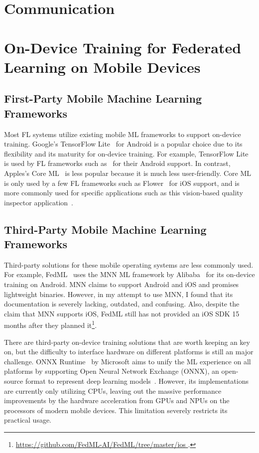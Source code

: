 \documentclass[conference]{IEEEtran}
\begin{document}
\section{Communication}

\section{On-Device Training for Federated Learning on Mobile Devices}

\subsection{First-Party Mobile Machine Learning Frameworks}

Most FL systems utilize existing mobile ML frameworks to
support on-device training.
Google's TensorFlow Lite~\cite{tensorflow2015-whitepaper,abadi2016tensorflow}
for Android is
a popular choice due to its flexibility and
its maturity for on-device training.
For example, TensorFlow Lite is used by FL frameworks such as~\cite{
    beutel2020flower,mathur2021ondevice,kourtellis2020flaas,katevas2022flaas}
for their Android support.
In contrast, Apples's Core ML~\cite{coreml} is less popular because
it is much less user-friendly.
Core ML is only used by a few FL frameworks such as
Flower~\cite{beutel2020flower} for iOS support,
and is more commonly used for specific applications
such as this vision-based quality inspector application~\cite{bharti2022edge}.

\subsection{Third-Party Mobile Machine Learning Frameworks}

Third-party solutions for these mobile operating systems are less commonly used.
For example, FedML~\cite{he2020fedml} uses
the MNN ML framework by Alibaba~\cite{jiang2020mnn,lv2022walle} for
its on-device training on Android.
MNN claims to support Android and iOS and promises lightweight binaries.
However, in my attempt to use MNN, I found that its documentation is
severely lacking, outdated, and confusing.
Also, despite the claim that MNN supports iOS,
FedML still has not provided an iOS SDK 15 months after they planned
it\footnote{\url{
    https://github.com/FedML-AI/FedML/tree/master/ios
}.}.

There are third-party on-device training solutions that are worth keeping an key on,
but the difficulty to interface hardware on different platforms is
still an major challenge.
ONNX Runtime~\cite{onnxruntime} by Microsoft aims to
unify the ML experience on all platforms by
supporting Open Neural Network Exchange (ONNX),
an open-source format to represent deep learning
models~\cite{ParedesdelRio2020}.
However, its implementations are currently only utilizing CPUs,
leaving out the massive performance improvements by the hardware acceleration
from GPUs and NPUs on the processors of modern mobile devices.
This limitation severely restricts its practical usage.
\end{document}
